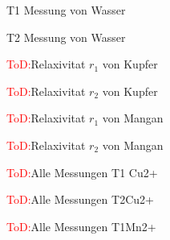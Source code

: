 
 

\begin{figure}[H]
    \centering
    
    \caption{T1 Messung von Wasser}
\end{figure}

\begin{figure}[H]
    \centering
    
    \caption{T2 Messung von Wasser}
\end{figure}

\begin{figure}[H]
    \centering
    
    \caption{\textcolor{red}{ToD:}Relaxivitat $r_1$ von Kupfer}
    \label{fig:RelaxCUT1}
\end{figure}

\begin{figure}[H]
    \centering
    
    \caption{\textcolor{red}{ToD:}Relaxivitat $r_2$ von Kupfer}
    \label{fig:RelaxCUT2}
\end{figure}

\begin{figure}[H]
    \centering
    
    \caption{\textcolor{red}{ToD:}Relaxivitat $r_1$ von Mangan}
    \label{fig:RelaxMNT1}
\end{figure}

\begin{figure}[H]
    \centering
    
    \caption{\textcolor{red}{ToD:}Relaxivitat $r_2$ von Mangan}
    \label{fig:RelaxMNT2}
\end{figure}

\begin{figure}[H]
    \centering
    
    \caption{\textcolor{red}{ToD:}Alle Messungen T1 Cu2+}
    \label{fig:T1CU}
\end{figure}

\begin{figure}[H]
    \centering
    
    \caption{\textcolor{red}{ToD:}Alle Messungen T2Cu2+}
    \label{fig:T2CU}
\end{figure}

\begin{figure}[H]
    \centering
    
    \caption{\textcolor{red}{ToD:}Alle Messungen T1Mn2+}
    \label{fig:T1Mn}
\end{figure}

